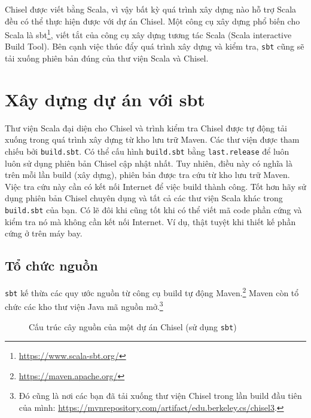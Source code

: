 \documentclass[%
    10pt,
    headinclude, footexclude,
    openright, %
    notitlepage,
    cleardoubleempty,
    headsepline,
    pointlessnumbers,
    bibtotoc, idxtotoc,
    ]{scrbook}
\newcommand{\code}[1]{{\small{\texttt{#1}}}}
\newcommand{\myref}[2]{\href{#1}{#2}}
\renewcommand{\myref}[2]{{#2}{\footnote{\url{#1}}}}
\begin{document}
Chisel được viết bằng Scala, vì vậy bất kỳ quá trình xây dựng nào hỗ trợ Scala đều có thể thực hiện
được với dự án Chisel. Một công cụ xây dựng phổ biến cho Scala là \myref{https://www.scala-sbt.org/}{sbt},
viết tắt của công cụ xây dựng tương tác Scala (Scala interactive Build Tool).
Bên cạnh việc thúc đẩy quá trình xây dựng và kiểm tra, \code{sbt} cũng sẽ tải xuống phiên bản đúng của thư viện Scala và Chisel.

\section{Xây dựng dự án với sbt}


Thư viện Scala đại diện cho Chisel và trình kiểm tra Chisel được tự động tải xuống 
trong quá trình xây dựng từ kho lưu trữ Maven. Các thư viện được 
tham chiếu bởi \code{build.sbt}. Có thể cấu hình \code{build.sbt} bằng \code{last.release} để luôn luôn sử dụng phiên bản Chisel cập nhật nhất. Tuy nhiên, điều này có nghĩa là trên mỗi lần build (xây dựng), phiên bản được tra cứu từ kho lưu trữ Maven. Việc tra cứu này cần có kết nối Internet để việc build thành công. Tốt hơn hãy sử dụng phiên bản Chisel chuyên dụng và tất cả các thư viện Scala khác trong \code{build.sbt} của bạn. Có lẽ đôi khi cũng tốt khi có thể viết mã code phần cứng và kiểm tra nó mà không cần kết nối Internet.
Ví dụ, thật tuyệt khi thiết kế phần cứng ở trên máy bay.

\subsection{Tổ chức nguồn}


\code{sbt} kế thừa các quy ước nguồn từ công cụ build tự động \myref{https://maven.apache.org/}{Maven.}
Maven còn tổ chức các kho thư viện Java mã nguồn mở.\footnote{Đó cũng là nơi các bạn đã tải xuống thư viện Chisel 
trong lần build đầu tiên của mình:
\url{https://mvnrepository.com/artifact/edu.berkeley.cs/chisel3}.}

\begin{figure}
\caption{Cấu trúc cây nguồn của một dự án Chisel (sử dụng \code{sbt})}
\label{fig:folders}
\end{figure}
\end{document}
